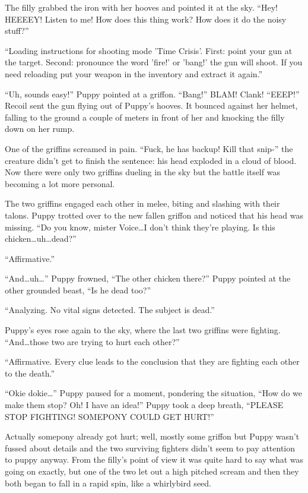 The filly grabbed the iron with her hooves and pointed it at the sky. ``Hey! HEEEEY! Listen to me! How does this thing work? How does it do the noisy stuff?''

``{\mt Loading instructions for shooting mode 'Time Crisis'. First: point your gun at the target. Second: pronounce the word 'fire!' or 'bang!' the gun will shoot. If you need reloading put your weapon in the inventory and extract it again.}''

``Uh, sounds easy!'' Puppy pointed at a griffon. ``Bang!'' BLAM! Clank! ``EEEP!'' Recoil sent the gun flying out of Puppy's hooves. It bounced against her helmet, falling to the ground a couple of meters in front of her and knocking the filly down on her rump.

One of the griffins screamed in pain. ``Fuck, he has backup! Kill that snip-'' the creature didn't get to finish the sentence: his head exploded in a cloud of blood. Now there were only two griffins dueling in the sky but the battle itself was becoming a lot more personal.

The two griffins engaged each other in melee, biting and slashing with their talons. Puppy trotted over to the new fallen griffon and noticed that his head was missing. ``Do you know, mister Voice\dots I don't think they're playing. Is this chicken\dots uh\dots dead?''

``{\mt Affirmative.}''

``And\dots uh\dots'' Puppy frowned, ``The other chicken there?'' Puppy pointed at the other grounded beast, ``Is he dead too?''

``{\mt Analyzing. No vital signs detected. The subject is dead.}''

Puppy's eyes rose again to the sky, where the last two griffins were fighting. ``And\dots those two are trying to hurt each other?''

``{\mt Affirmative. Every clue leads to the conclusion that they are fighting each other to the death.}''

``Okie dokie\dots'' Puppy paused for a moment, pondering the situation, ``How do we make them stop? Oh! I have an idea!'' Puppy took a deep breath, ``PLEASE STOP FIGHTING! SOMEPONY COULD GET HURT!''

Actually somepony already got hurt; well, mostly some griffon but Puppy wasn't fussed about details and the two surviving fighters didn't seem to pay attention to puppy anyway. From the filly's point of view it was quite hard to say what was going on exactly, but one of the two let out a high pitched scream and then they both began to fall in a rapid spin, like a whirlybird seed.

